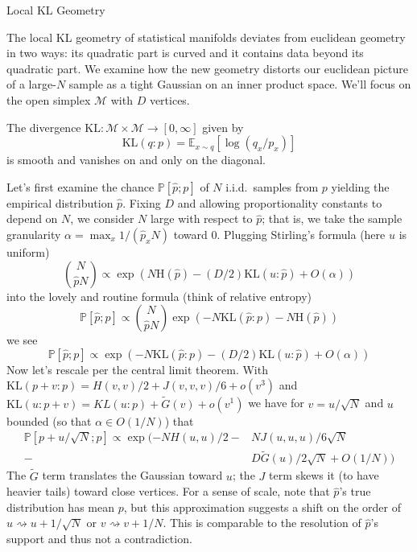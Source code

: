 \documentclass[12pt]{article}
\newcommand{\KL}{\text{KL}}
\newcommand{\EN}{\text{H}}
\newcommand{\Mm}{\mathcal{M}}
\newcommand{\EE}{\mathbb{E}}
\newcommand{\PP}{\mathbb{P}}
\theoremstyle{definition}
\begin{document}
{
    \centering \Huge \sf \color{mblu} 
    Local KL Geometry
    \vspace{0.5cm}
}


    The local KL geometry of statistical manifolds deviates from euclidean
    geometry in two ways: its quadratic part is curved and it contains data
    beyond its quadratic part.  
    We examine how the new geometry distorts our euclidean picture of a
    large-$N$ sample as a tight Gaussian on an inner product space.  We'll
    focus on the open simplex $\Mm$ with $D$ vertices. 

    The divergence $\KL:\Mm\times \Mm \to [0,\infty]$ given by 
    $$
        \KL(q:p) = \EE_{x \sim q}[\log(q_x/p_x)]
    $$
    is smooth and vanishes on and only on the diagonal.

    Let's first examine the chance $\PP[\hat p ; p]$ of $N$ i.i.d.\ samples
    from $p$ yielding the empirical distribution $\hat p$.  Fixing $D$ and allowing
    proportionality constants to depend on $N$, we 
    consider $N$ large with respect to $\hat p$; that is, we take the sample
    granularity
    $\alpha=\max_x 1/(\hat p_x N)$ toward $0$.
    Plugging Stirling's formula (here $u$ is uniform) 
    $$
        {N \choose \hat p N} \propto
        \exp(N\EN(\hat p) - (D/2)\KL(u:\hat p) + O(\alpha)) 
    $$
    into the lovely and routine formula (think of relative entropy)
    $$
        \PP[\hat p ; p] \propto
        {N \choose \hat p N} \exp(-N\KL(\hat p : p) - N\EN(\hat p)) 
    $$
    we see
    $$
        \PP[\hat p ; p] \propto
        \exp(-N\KL(\hat p : p) - (D/2)\KL(u:\hat p) + O(\alpha)) 
    $$
    Now let's rescale per the central limit theorem.  With $\KL(p+v:p) =
    H(v,v)/2 + J(v,v,v)/6 + o(v^3)$ and $\KL(u:p+v) = KL(u:p) + \tilde G(v)
    + o(v^1)$ we have for $v = u/\sqrt{N}$ and $u$ bounded (so that $\alpha \in
    O(1/N)$) that
    \begin{align*}
        \PP[p+u/\sqrt{N} ; p] \propto
        \exp(-NH(u,u)/2 - & N J(u,u,u)/6\sqrt{N}\\
                        - & D \tilde G(u)/2\sqrt{N} + O(1/N)) 
    \end{align*}
    The $\tilde G$ term translates the Gaussian toward $u$; the $J$ term skews
    it (to have heavier tails) toward close vertices.  For a sense of
    scale, note that $\hat p$'s true distribution has mean $p$, but this
    approximation suggests a shift on the order of $u \rightsquigarrow
    u+1/\sqrt{N}$ or $v \rightsquigarrow v+1/N$.  This is comparable to the
    resolution of $\hat p$'s support and thus not a contradiction.
\end{document}

